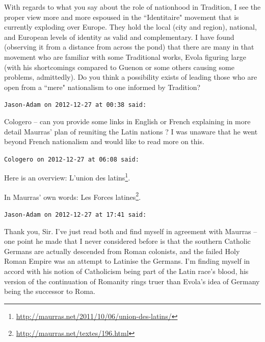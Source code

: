 \begin{footnotesize}
\begin{sffamily}
With regards to what you say about the role of nationhood in Tradition, I see the proper view more and more espoused in the ``Identitaire" movement that is currently exploding over Europe. They hold the local (city and region), national, and European levels of identity as valid and complementary. I have found (observing it from a distance from across the pond) that there are many in that movement who are familiar with some Traditional works, Evola figuring large (with his shortcomings compared to Guenon or some others causing some problems, admittedly). Do you think a possibility exists of leading those who are open from a ``mere" nationalism to one informed by Tradition?


\hfill

\texttt{Jason-Adam on 2012-12-27 at 00:38 said: }

Cologero – can you provide some links in English or French explaining in more detail Maurras' plan of reuniting the Latin nations ? I was unaware that he went beyond French nationalism and would like to read more on this.


\hfill

\texttt{Cologero on 2012-12-27 at 06:08 said: }

Here is an overview: L'union des latins\footnote{\url{http://maurras.net/2011/10/06/union-des-latins/}}.

In Maurras' own words: Les Forces latines\footnote{\url{http://maurras.net/textes/196.html}}.


\hfill

\texttt{Jason-Adam on 2012-12-27 at 17:41 said: }

Thank you, Sir. I've just read both and find myself in agreement with Maurras – one point he made that I never considered before is that the southern Catholic Germans are actually descended from Roman colonists, and the failed Holy Roman Empire was an attempt to Latinise the Germans. I'm finding myself in accord with his notion of Catholicism being part of the Latin race's blood, his version of the continuation of Romanity rings truer than Evola's idea of Germany being the successor to Roma.


\end{sffamily}\end{footnotesize}
